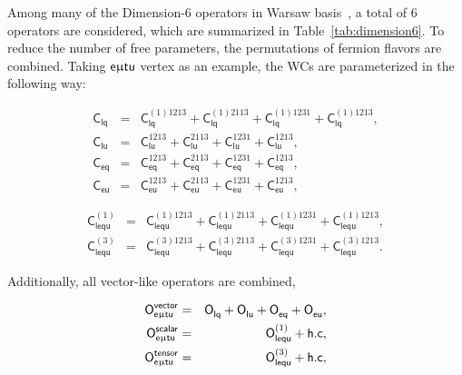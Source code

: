Among many of the Dimension-6 operators in Warsaw basis~\cite{Aguilar-Saavedra:2018ksv}, a total of 6 operators are considered, which are summarized in Table~\ref{tab:dimension6}. To reduce the number of free parameters, the permutations of fermion flavors are combined. Taking $\textsf{e}\upmu\textsf{t{u}}$ vertex as an example, the \acp{WC} are parameterized in the following way:

\begin{eqnarray}
\label{eq:1:0}
 \textsf{C}_{\textsf{lq}}
 &=& \textsf{C}_{\textsf{lq}}^{(1)1213}
 + \textsf{C}_{\textsf{lq}}^{(1)2113}
 + \textsf{C}_{\textsf{lq}}^{(1)1231}
 + \textsf{C}_{\textsf{lq}}^{(1)1213}
 ,\\
\label{eq1:1}
 \textsf{C}_{\textsf{lu}}  
 &=& \textsf{C}_{\textsf{lu}}^{1213}
 + \textsf{C}_{\textsf{lu}}^{2113}
 + \textsf{C}_{\textsf{lu}}^{1231}
 + \textsf{C}_{\textsf{lu}}^{1213}
 ,\\
 \label{eq:1:2}
 \textsf{C}_{\textsf{eq}}
 &=& \textsf{C}_{\textsf{eq}}^{1213}
 + \textsf{C}_{\textsf{eq}}^{2113}
 + \textsf{C}_{\textsf{eq}}^{1231}
 + \textsf{C}_{\textsf{eq}}^{1213}
 ,\\
 \label{eq:1:3}
 \textsf{C}_{\textsf{eu}}  
 &=& \textsf{C}_{\textsf{eu}}^{1213}
 + \textsf{C}_{\textsf{eu}}^{2113}
 + \textsf{C}_{\textsf{eu}}^{1231}
 + \textsf{C}_{\textsf{eu}}^{1213},
\end{eqnarray}

\begin{eqnarray}
\label{eq:1:4}
 \textsf{C}_{\textsf{lequ}}^{(1)}  
 &=& \textsf{C}_{\textsf{lequ}}^{(1)1213}
 + \textsf{C}_{\textsf{lequ}}^{(1)2113}
 + \textsf{C}_{\textsf{lequ}}^{(1)1231}
 + \textsf{C}_{\textsf{lequ}}^{(1)1213}
  ,\\
\label{eq:1:5}
 \textsf{C}_{\textsf{lequ}}^{(3)}
 &=& \textsf{C}_{\textsf{lequ}}^{(3)1213}
 + \textsf{C}_{\textsf{lequ}}^{(3)2113}
 + \textsf{C}_{\textsf{lequ}}^{(3)1231}
 + \textsf{C}_{\textsf{lequ}}^{(3)1213}. 
\end{eqnarray}

Additionally, all vector-like operators are combined,

\begin{eqnarray}
\label{eq:1:6}
 \textsf{O}^{\textsf{vector}}_{\textsf{e}\upmu\textsf{t{u}}}&=&\textsf{O}^{}_{\textsf{lq}}+\textsf{O}^{}_{\textsf{lu}}+\textsf{O}^{}_{\textsf{eq}}+\textsf{O}^{}_{\textsf{eu}},\\
\label{eq:1:7}
 \textsf{O}^{\textsf{scalar}}_{\textsf{e}\upmu\textsf{t{u}}}&=&\textsf{O}^{(1)}_{\textsf{lequ}}+\textsf{h.c},\\
\label{eq:1:8}
 \textsf{O}^{\textsf{tensor}}_{\textsf{e}\upmu\textsf{t{u}}}&=&\textsf{O}^{(3)}_{\textsf{lequ}}+\textsf{h.c},
\end{eqnarray}

